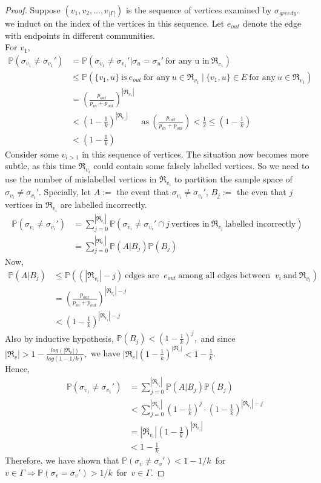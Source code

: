 \begin{proof}
    Suppose $(v_1, v_2, \ldots, v_{|\Gamma|})$ is the sequence of vertices examined by $\sigma_{greedy}$. we induct on the index of the vertices in this sequence. Let $e_{out}$ denote the edge with endpoints in different communities.\\
    For $v_1,$ \begin{align*}
    \mathbb{P}(\sigma_{v_1}\neq\sigma_{v_1}')&=\mathbb{P}(\sigma_{v_1}\neq\sigma_{v_1}'|\sigma_u=\sigma_u'~\text{for any u in}~\Re_{v_1})\\
    &\leq\mathbb{P}(\{v_1, u\}~\text{is}~e_{out}~\text{for any}~u\in\Re_{v_1}~|~\{v_1, u\}\in E~\text{for any}~u\in\Re_{v_1})\\
    &=(\frac{p_{out}}{p_{in}+p_{out}})^{|\Re_{v_1}|}\\
    &<(1-\frac{1}{k})^{|\Re_{v_1}|} ~~~~~~~\text{as}~(\frac{p_{out}}{p_{in}+p_{out}})<\frac{1}{2}\leq(1-\frac{1}{k})\\
    &<(1-\frac{1}{k})
    \end{align*}
    Consider some $v_{i>1}$ in this sequence of vertices. The situation now becomes more subtle, as this time $\Re_{v_i}$ could contain some falsely labelled vertices. So we need to use the number of mislabelled vertices in $\Re_{v_i}$ to partition the sample space of $\sigma_{v_i}\neq\sigma_{v_i}'$. Specially, let $A:=$ the event that $\sigma_{v_i}\neq\sigma_{v_i}'$, $B_j:=$ the even that $j$ vertices in $\Re_{v_i}$ are labelled incorrectly. \begin{align*}
    \mathbb{P}(\sigma_{v_i}\neq\sigma_{v_i}')&=\sum_{j=0}^{|\Re_{v_i}|}\mathbb{P}(\sigma_{v_i}\neq\sigma_{v_i}'\cap j~\text{vertices in}~\Re_{v_i}~\text{labelled incorrectly})\\
    &=\sum_{j=0}^{|\Re_{v_i}|}\mathbb{P}(A|B_j)\mathbb{P}(B_j)
    \end{align*}
Now, \begin{align*}
    \mathbb{P}(A|B_j)&\leq\mathbb{P}((|\Re_{v_i}|-j)~\text{edges are }~e_{out}~\text{among all edges between }~v_i~\text{and}~\Re_{v_i})\\
    &=(\frac{p_{out}}{p_{in}+p_{out}})^{|\Re_{v_i}|-j}\\
    &<(1-\frac{1}{k})^{|\Re_{v_i}|-j}
\end{align*} 
Also by inductive hypothesis, $\mathbb{P}(B_j)<(1-\frac{1}{k})^j,$ and since $|\Re_v|>1-\frac{log(|\Re_v|)}{log(1-1/k)},$ we have $|\Re_v|(1-\frac{1}{k})^{|\Re_v|}<1-\frac{1}{k}$.\\Hence,
\begin{align*}
    ~~~~~~~~\mathbb{P}(\sigma_{v_1}\neq\sigma_{v_1}')&=\sum_{j=0}^{|\Re_{v_i}|}\mathbb{P}(A|B_j)\mathbb{P}(B_j)\\
    &<\sum_{j=0}^{|\Re_{v_i}|}(1-\frac{1}{k})^j\cdot(1-\frac{1}{k})^{|\Re_{v_i}|-j}\\
    &=|\Re_{v_i}|(1-\frac{1}{k})^{|\Re_{v_i}|}\\
    &<1-\frac{1}{k}
\end{align*}
Therefore, we have shown that $\mathbb{P}(\sigma_{v}\neq\sigma_{v}')<1-1/k$~for~$v\in\Gamma \Rightarrow\mathbb{P}(\sigma_{v}=\sigma_{v}')>1/k$~for~$v\in\Gamma.$
\end{proof}
